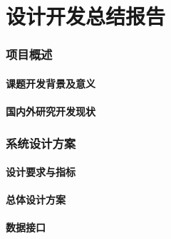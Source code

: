 \part{设计开发总结报告} %
\label{prt:设计开发总结报告_}
	\setcounter{section}{0}
	\section{项目概述} %
	\label{sec:项目概述}
		\subsection{课题开发背景及意义} %
		\label{sub:课题开发背景及意义}
		
		\newpage

		\subsection{国内外研究开发现状} %
		\label{sub:国内外研究开发现状}
		
	\newpage

	\section{系统设计方案} %
	\label{sec:系统设计方案}
		\subsection{设计要求与指标} %
		\label{sub:设计要求与指标}
		
		\newpage

		\subsection{总体设计方案} %
		\label{sub:总体设计方案}
		
		\newpage

		\subsection{数据接口} %
		\label{sub:数据接口}
		
